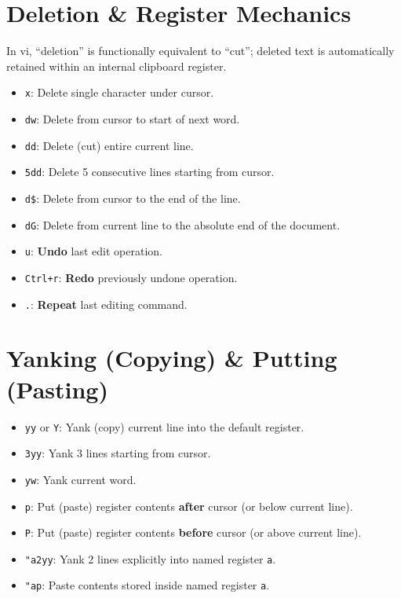 \section{Deletion \& Register Mechanics}
In vi, ``deletion'' is functionally equivalent to ``cut''; deleted text is automatically retained within an internal clipboard register.
\begin{itemize}[leftmargin=1.5em]
    \item \texttt{x}: Delete single character under cursor.
    \item \texttt{dw}: Delete from cursor to start of next word.
    \item \texttt{dd}: Delete (cut) entire current line.
    \item \texttt{5dd}: Delete 5 consecutive lines starting from cursor.
    \item \texttt{d\$}: Delete from cursor to the end of the line.
    \item \texttt{dG}: Delete from current line to the absolute end of the document.
    \item \texttt{u}: \textbf{Undo} last edit operation.
    \item \texttt{Ctrl+r}: \textbf{Redo} previously undone operation.
    \item \texttt{.}: \textbf{Repeat} last editing command.
\end{itemize}

\section{Yanking (Copying) \& Putting (Pasting)}
\begin{itemize}[leftmargin=1.5em]
    \item \texttt{yy} or \texttt{Y}: Yank (copy) current line into the default register.
    \item \texttt{3yy}: Yank 3 lines starting from cursor.
    \item \texttt{yw}: Yank current word.
    \item \texttt{p}: Put (paste) register contents \textbf{after} cursor (or below current line).
    \item \texttt{P}: Put (paste) register contents \textbf{before} cursor (or above current line).
    \item \texttt{"a2yy}: Yank 2 lines explicitly into named register \texttt{a}.
    \item \texttt{"ap}: Paste contents stored inside named register \texttt{a}.
\end{itemize}

